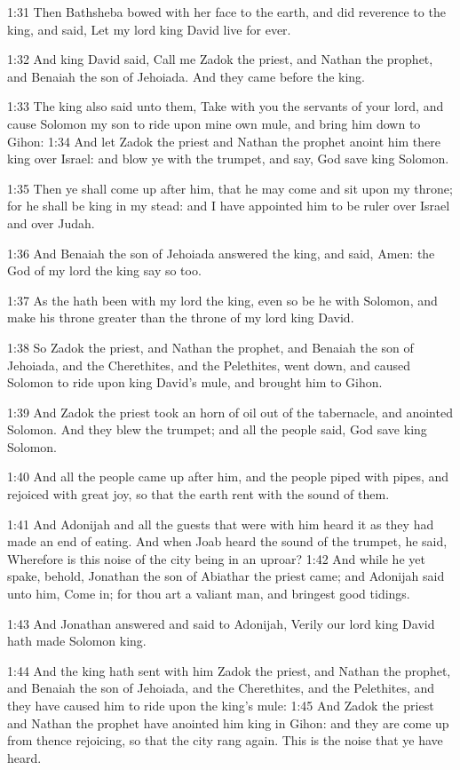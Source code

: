 1:31 Then Bathsheba bowed with her face to the earth, and did reverence to the king, and said, Let my lord king David live for ever.

1:32 And king David said, Call me Zadok the priest, and Nathan the prophet, and Benaiah the son of Jehoiada. And they came before the king.

1:33 The king also said unto them, Take with you the servants of your lord, and cause Solomon my son to ride upon mine own mule, and bring him down to Gihon: 1:34 And let Zadok the priest and Nathan the prophet anoint him there king over Israel: and blow ye with the trumpet, and say, God save king Solomon.

1:35 Then ye shall come up after him, that he may come and sit upon my throne; for he shall be king in my stead: and I have appointed him to be ruler over Israel and over Judah.

1:36 And Benaiah the son of Jehoiada answered the king, and said, Amen: the \LORD God of my lord the king say so too.

1:37 As the \LORD hath been with my lord the king, even so be he with Solomon, and make his throne greater than the throne of my lord king David.

1:38 So Zadok the priest, and Nathan the prophet, and Benaiah the son of Jehoiada, and the Cherethites, and the Pelethites, went down, and caused Solomon to ride upon king David's mule, and brought him to Gihon.

1:39 And Zadok the priest took an horn of oil out of the tabernacle, and anointed Solomon. And they blew the trumpet; and all the people said, God save king Solomon.

1:40 And all the people came up after him, and the people piped with pipes, and rejoiced with great joy, so that the earth rent with the sound of them.

1:41 And Adonijah and all the guests that were with him heard it as they had made an end of eating. And when Joab heard the sound of the trumpet, he said, Wherefore is this noise of the city being in an uproar?  1:42 And while he yet spake, behold, Jonathan the son of Abiathar the priest came; and Adonijah said unto him, Come in; for thou art a valiant man, and bringest good tidings.

1:43 And Jonathan answered and said to Adonijah, Verily our lord king David hath made Solomon king.

1:44 And the king hath sent with him Zadok the priest, and Nathan the prophet, and Benaiah the son of Jehoiada, and the Cherethites, and the Pelethites, and they have caused him to ride upon the king's mule: 1:45 And Zadok the priest and Nathan the prophet have anointed him king in Gihon: and they are come up from thence rejoicing, so that the city rang again. This is the noise that ye have heard.

